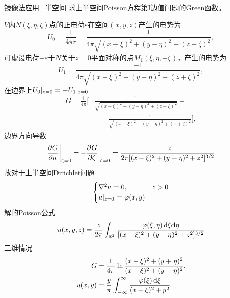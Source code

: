 \begin{example}{镜像法应用·半空间}{}
	求上半空间Poisson方程第I边值问题的Green函数。
	
	$V$内$N(\xi,\eta,\zeta)$点的正电荷$\varepsilon$在空间$(x,y,z)$产生的电势为
	\[
		U_0 = \frac1{4\pi r} = \frac1{4\pi\sqrt{(x - \xi)^2 + (y - \eta)^2 + (z - \zeta)^2}},
	\]
	可虚设电荷$-\varepsilon$于$N$关于$z = 0$平面对称的点$M_1(\xi,\eta,-\zeta)$，产生的电势为
	\[
		U_1 = \frac{-1}{4\pi\sqrt{(x - \xi)^2 + (y - \eta)^2 + (z + \zeta)^2}},
	\]
	在边界上${U_0}\rvert_{z=0} = -{U_1}\rvert_{z=0}$
    \begin{equation}
        \label{eq:mmp-half-space-dirichlet-green}
        \begin{aligned}
            G = \frac1{4\pi}\bigg[&\frac1{\sqrt{(x - \xi)^2 + (y - \eta)^2 + (z - \zeta)^2}} -\\
            &\qquad\frac1{\sqrt{(x - \xi)^2 + (y - \eta)^2 + (z + \zeta)^2}}\bigg],
        \end{aligned}
    \end{equation}
	边界方向导数
	\[
		{\frac{\partial^{}G}{\partial{n}^{}}}\biggr\rvert_{\zeta=0} = {-\frac{\partial^{}G}{\partial{\zeta}^{}}}\biggr\rvert_{\zeta=0} = \frac{-z}{2\pi[(x - \xi)^2 + (y - \eta)^2 + z^2]^{3/2}}
	\]
	故对于上半空间Dirichlet问题
	\[
		\begin{cases}
		\nabla^2 u = 0,&z > 0\\
		{u}\rvert_{z=0} = \varphi(x,y)
	\end{cases}
	\]
	解的Poisson公式
	\begin{equation}
		\label{eq:mmp-half-space-poisson-integral}
		u(x,y,z) = \frac z{2\pi}\int_{\mathbb{R}^2}\frac{\varphi(\xi,\eta)\mathop{}\!\mathrm{d}\xi\mathrm{d}\eta}{[(x - \xi)^2 + (y - \eta)^2 + z^2]^{3/2}}
	\end{equation}
	\tcblower
	二维情况
	\begin{subequations}
		\label{eq:mmp-half-plane-dirichlet-green}
		\begin{align}
			G &= \frac1{4\pi}\ln\frac{(x - \xi)^2 + (y + \eta)^2}{(x - \xi)^2 + (y - \eta)^2},\\
			u(x,y) &= \frac y\pi\int_{-\infty}^\infty\frac{\varphi(\xi)\mathop{}\!\mathrm{d}\xi}{(x - \xi)^2 + y^2}
		\end{align}
	\end{subequations}
\end{example}


